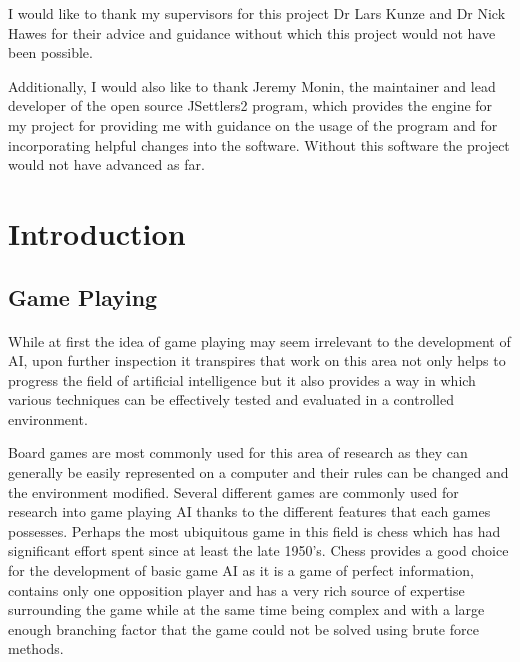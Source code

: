 \documentclass[]{article}
\let\oldsection\section
\renewcommand\section{\clearpage\oldsection}
\newenvironment{changemargin}[2]{%
\begin{list}{}{%
\setlength{\topsep}{0pt}%
\setlength{\leftmargin}{#1}%
\setlength{\rightmargin}{#2}%
\setlength{\listparindent}{\parindent}%
\setlength{\itemindent}{\parindent}%
\setlength{\parsep}{\parskip}%
}%
\item[]}{\end{list}}
\begin{document}
\begin{changemargin}{1.8cm}{1.8cm}

I would like to thank my supervisors for this project Dr Lars Kunze and Dr Nick Hawes for their advice and guidance without which this project would not have been possible.

\vspace{0.2cm}

Additionally, I would also like to thank Jeremy Monin, the maintainer and lead developer of the open source JSettlers2 program, which provides the engine for my project for providing me with guidance on the usage of the program and for incorporating helpful changes into the software. Without this software the project would not have advanced as far.


\end{changemargin}

\tableofcontents

\pagebreak


\section{Introduction}
\subsection{Game Playing}
\paragraph{} While at first the idea of game playing may seem irrelevant to the development of AI, upon further inspection it transpires that work on this area not only helps to progress the field of artificial intelligence but it also provides a way in which various techniques can be effectively tested and evaluated in a controlled environment.

\par Board games are most commonly used for this area of research as they can generally be easily represented on a computer and their rules can be changed and the environment modified. Several different games are commonly used for research into game playing AI thanks to the different features that each games possesses. Perhaps the most ubiquitous game in this field is chess which has had significant effort spent since at least the late 1950's. Chess provides a good choice for the development of basic game AI as it is a game of perfect information, contains only one opposition player and has a very rich source of expertise surrounding the game while at the same time being complex and with a large enough branching factor that the game could not be solved using brute force methods.
\end{document}
